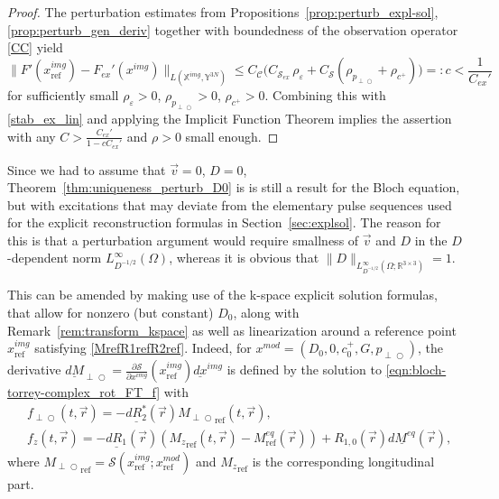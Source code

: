 \documentclass{ws-m3as}
\newcommand{\uld}[1]{\underline{d#1}}
\def\Mpp{M_{\perp\!\!\!\!\!\bigcirc}}
\def\pp{p_{\perp\!\!\!\!\!\bigcirc}}
\def\uldMpp{\uld{M}_{\perp\!\!\!\!\!\bigcirc}}
\def\fpp{f_{\perp\!\!\!\!\!\bigcirc}}
\newcommand\taup{\varepsilon}
\begin{document}
\begin{proof}
The perturbation estimates from Propositions~\ref{prop:perturb_expl-sol}, \ref{prop:perturb_gen_deriv} together with boundedness of the observation operator \eqref{CC} yield
\[
\|F'(x^{img}_{\text{ref}})-F_{ex}'(x^{img})\|_{L(\mathbb{X}^{img},\mathbb{Y}^{3N})}
\leq C_{\mathcal{C}}\bigl(C_{\mathcal{S}_{ex}}\,\rho_{\taup} +C_{\mathcal{S}}(\rho_{\pp}
+\rho_{c^+})\bigr)=:c<\frac{1}{C_{ex}'}
\]
for sufficiently small $\rho_{\taup}>0$, $\rho_{\pp}>0$, 
$\rho_{c^+}>0$.
Combining this with \eqref{stab_ex_lin} and applying the Implicit Function Theorem implies the assertion with any $C>\frac{C_{ex}'}{1-cC_{ex}'}$ and $\rho>0$ small enough. 
\end{proof}

Since we had to assume that $\vec v=0$, $D=0$, Theorem~\ref{thm:uniqueness_perturb_D0} is is still a result for the Bloch equation, but with excitations that may deviate from the elementary pulse sequences used for the explicit reconstruction formulas in %
Section~\ref{sec:explsol}.
The reason for this is that a perturbation argument would require smallness of $\vec{v}$ and $D$ in the $D$-dependent norm $L^\infty_{D^{-1/2}}(\Omega)$, whereas it is obvious that 
$\|D\|_{L^\infty_{D^{-1/2}}(\Omega;\mathbb{R}^{3\times 3})}=1$.

This can be amended by making use of the k-space explicit solution formulas, that allow for nonzero (but constant) $D_0$, along with Remark~\ref{rem:transform_kspace} as well as linearization around a reference point $x^{img}_{\text{ref}}$ satisfying \eqref{MrefR1refR2ref}.
Indeed, for $x^{mod}=(D_0,0,c^+_0,G,\pp)$, the derivative $\uldMpp=\frac{\partial\mathcal{S}}{\partial x^{img}}(x^{img}_{\text{ref}})\uld{x}^{img}$ is defined by the solution to \eqref{eqn:bloch-torrey-complex_rot_FT_f} with   
\[
\begin{aligned}
&\fpp(t,\vec r)=-\uld{R_2^*}(\vec r){\Mpp}_{\text{ref}}(t,\vec r), \\
&f_z(t,\vec r)=-\uld{R_1}(\vec r)({M_z}_{\text{ref}}(t,\vec r)-M^{eq}_{\text{ref}}(\vec r))+
R_{1,0}(\vec r)\uld{M^{eq}}(\vec r),
\end{aligned}
\]
where ${\Mpp}_{\text{ref}}=\mathcal{S}(x^{img}_{\text{ref}};x^{mod}_{\text{ref}})$ and ${M_z}_{\text{ref}}$ is the corresponding longitudinal part.
\end{document}
